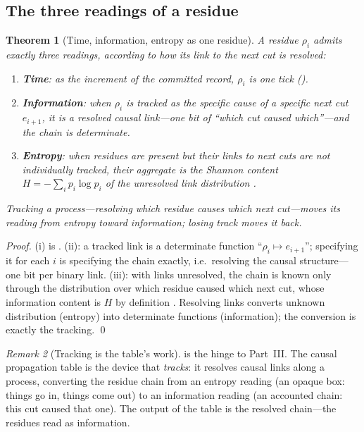 \documentclass[11pt,a4paper]{article}
\theoremstyle{thmstyle}
\newtheorem{theorem}{Theorem}[section]
\theoremstyle{definition}
\theoremstyle{remark}
\newtheorem{remark}[theorem]{Remark}
\newcommand{\res}{\rho}                  %
\begin{document}
\subsection{The three readings of a residue}

\begin{theorem}[Time, information, entropy as one residue]
\label{thm:three-readings}
A residue $\res_i$ admits exactly three readings, according to how its link
to the next cut is resolved:
\begin{enumerate}[label=\textup{(\roman*)},leftmargin=2.2em]
\item \textbf{Time}: as the increment of the committed record, $\res_i$ is
one tick ().
\item \textbf{Information}: when $\res_i$ is tracked as the specific cause
of a specific next cut $e_{i+1}$, it is a resolved causal link---one bit of
``which cut caused which''---and the chain is determinate.
\item \textbf{Entropy}: when residues are present but their links to next
cuts are not individually tracked, their aggregate is the Shannon content
$H=-\sum_i p_i\log p_i$ of the unresolved link distribution
\citep{shannon1948,cover2006}.
\end{enumerate}
Tracking a process---resolving which residue causes which next cut---moves
its reading from entropy toward information; losing track moves it back.
\end{theorem}

\begin{proof}
(i) is . (ii): a tracked link is a determinate function
``$\res_i\mapsto e_{i+1}$''; specifying it for each $i$ is specifying the
chain exactly, i.e.\ resolving the causal structure---one bit per binary
link. (iii): with links unresolved, the chain is known only through the
distribution over which residue caused which next cut, whose information
content is $H$ by definition \citep{shannon1948}. Resolving links converts
unknown distribution (entropy) into determinate functions (information);
the conversion is exactly the tracking. \qed
\end{proof}

\begin{remark}[Tracking is the table's work]
\label{rem:tracking}
 is the hinge to Part~III. The causal propagation
table is the device that \emph{tracks}: it resolves causal links along a
process, converting the residue chain from an entropy reading (an opaque
box: things go in, things come out) to an information reading (an accounted
chain: this cut caused that one). The output of the table is the resolved
chain---the residues read as information.
\end{remark}
\end{document}
